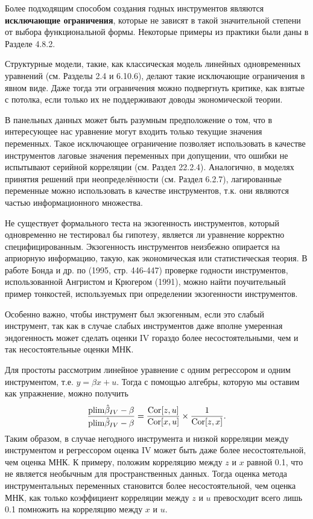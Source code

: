 Более подходящим способом создания годных инструментов являются \textbf{исключающие ограничения}, которые не зависят в такой значительной степени от выбора функциональной формы. Некоторые примеры из практики были даны в Разделе 4.8.2.

Структурные модели, такие, как классическая модель линейных одновременных уравнений (см. Разделы 2.4 и 6.10.6), делают такие исключающие ограничения в явном виде. Даже тогда эти ограничения можно подвергнуть критике, как взятые с потолка, если только их не поддерживают доводы экономической теории.

В панельных данных может быть разумным предположение о том, что в интересующее нас уравнение могут входить только текущие значения переменных. Такое исключающее ограничение позволяет использовать в качестве инструментов лаговые значения переменных при допущении, что ошибки не испытывают серийной корреляции (см. Раздел 22.2.4). Аналогично, в моделях принятия решений при неопределённости (см. Раздел 6.2.7), лагированные переменные можно использовать в качестве инструментов, т.к. они являются частью информационного множества.

Не существует формального теста на экзогенность инструментов, который одновременно не тестировал бы гипотезу, является ли уравнение корректно специфицированным. Экзогенность инструментов неизбежно опирается на априорную информацию, такую, как экономическая или статистическая теория. В работе Бонда и др. по (1995, стр. 446-447) проверке годности инструментов, использованной Ангристом и Крюгером (1991), можно найти поучительный пример тонкостей, используемых при определении экзогенности инструментов.

Особенно важно, чтобы инструмент был экзогенным, если это слабый инструмент, так как в случае слабых инструментов даже вполне умеренная эндогенность может сделать оценки IV гораздо более несостоятельными, чем и так несостоятельные оценки МНК.

Для простоты рассмотрим линейное уравнение с одним регрессором и одним инструментом, т.е. $y = \beta x +u$. Тогда с помощью алгебры, которую мы оставим как упражнение, можно получить 
\begin{equation}
\frac{\mathrm{plim } \hat{\beta}_{IV}-\beta}{\mathrm{plim } \hat{\beta}_{IV}-\beta}
=\frac{\mathrm{Cor}[z,u]}{\mathrm{Cor}[x,u]}\times \frac{1}{\mathrm{Cor}[z,x]}.
\end{equation}
Таким образом, в случае негодного инструмента и низкой корреляции между инструментом и регрессором оценка IV может быть даже более несостоятельной, чем оценка МНК. К примеру, положим корреляцию между $z$ и $x$ равной 0.1, что не является необычным для пространственных данных. Тогда оценка метода инструментальных переменных становится более несостоятельной, чем оценка МНК, как только коэффициент корреляции между $z$ и $u$ превосходит всего лишь 0.1 помножить на корреляцию между $x$ и $u$. 

